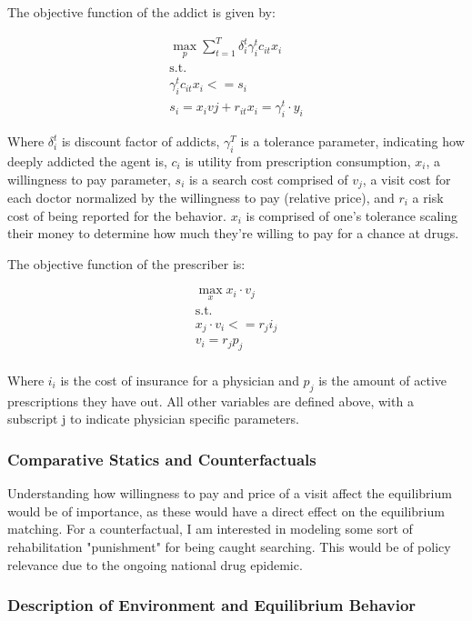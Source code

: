 \documentclass[11pt,a4paper]{article}
\begin{document}
The objective function of the addict is given by:

\begin{gather*}
  \max_p \sum\limits_{t=1}^{T} \delta^t_i \gamma_i^tc_{it}x_i \\
  \text{s.t.} \\
  \gamma_i^tc_{it}x_i <= s_i \\
  s_i = x_ivj + r_{it}
  x_i = \gamma_i^t\cdot y_i
\end{gather*}

Where $\delta_i^t$ is discount factor of addicts, $\gamma_i^T$ is a tolerance parameter, indicating how deeply addicted the agent is, $c_i$ is utility from prescription consumption, $x_i$, a willingness to pay parameter, 
$s_i$ is a search cost comprised of  $v_j$, a visit cost for each doctor normalized by the willingness to pay (relative price), and $r_i$ a risk cost of being reported for the behavior. $x_i$ is comprised
of one's tolerance scaling their money to determine how much they're willing to pay for a chance at drugs.

The objective function of the prescriber is:

\begin{gather*}
  \max_x x_i\cdot v_j \\
  \text{s.t.} \\
  x_j\cdot v_i <= r_j i_j \\
  v_i = r_jp_j \\
\end{gather*}

Where $i_i$ is the cost of insurance for a physician and $p_j$ is the amount of active prescriptions they have out. All other variables are defined above, with a subscript j to indicate physician specific parameters.

\subsubsection*{Comparative Statics and Counterfactuals}
\label{subsubsec:comparative&counterfactuals}

Understanding how willingness to pay and price of a visit affect the equilibrium would be of importance, as these would have a direct effect on the equilibrium matching.
For a counterfactual, I am interested in modeling some sort of rehabilitation "punishment" for being caught searching. This would be of policy relevance due to the ongoing national drug epidemic.

\subsubsection*{Description of Environment and Equilibrium Behavior}
\label{subsubsec:eq&behavior}
\end{document}
